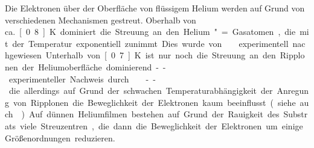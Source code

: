 Die Elektronen über der Oberfläche von flüssigem Helium werden auf Grund von verschiedenen Mechanismen gestreut. Oberhalb von ca.\ \unit[0.8]{K} dominiert die Streuung an den Helium"=Gasatomen, die mit der Temperatur exponentiell zunimmt. Dies wurde von  \ea \cite{Som71} experimentell nachgewiesen. Unterhalb von \unit[0.7]{K} ist nur noch die Streuung an den Ripplonen der Heliumoberfläche dominierend -- experimenteller Nachweis durch  \ea \cite{Gri76} -- die allerdings auf Grund der schwachen Temperaturabhängigkeit der Anregung von Ripplonen die Beweglichkeit der Elektronen kaum beeinflusst (siehe auch \cite{Bri77,Col74}). Auf dünnen Heliumfilmen bestehen auf Grund der Rauigkeit des Substrats viele Streuzentren, die dann die Beweglichkeit der Elektronen um einige Größenordnungen reduzieren. 
